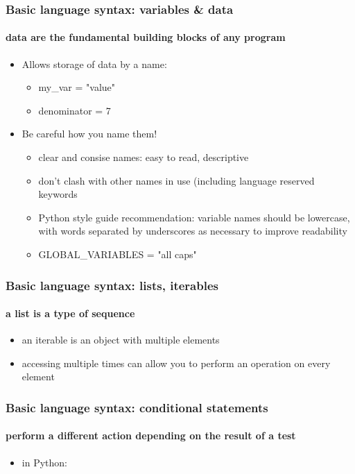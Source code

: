 \documentclass{beamer}
\begin{document}
    \begin{frame}
	    \frametitle{Basic language syntax: variables \& data}
	    \framesubtitle{data are the fundamental building blocks of any program}
	    \begin{itemize}
		    \item Allows storage of data by a name:
			    \begin{itemize}
				    \item my\_var = "value"
				    \item denominator = 7
			    \end{itemize}
		    \item Be careful how you name them!
			    \begin{itemize}
				    \item clear and consise names: easy to read, descriptive
				    \item don't clash with other names in use (including language reserved keywords
				    \item Python style guide recommendation: variable names should be lowercase, with words separated by underscores as necessary to improve readability
				    \item GLOBAL\_VARIABLES = "all caps"
			    \end{itemize}
	    \end{itemize}
    \end{frame}

    \begin{frame}
	    \frametitle{Basic language syntax: lists, iterables}
	    \framesubtitle{a list is a type of sequence}
	    \begin{itemize}
		    \item an iterable is an object with multiple elements
		    \item accessing multiple times can allow you to perform an operation on every element
	    \end{itemize}
    \end{frame}



    \begin{frame}
	    \frametitle{Basic language syntax: conditional statements}
	    \framesubtitle{perform a different action depending on the result of a test}
	    \begin{itemize}
		    \item in Python:
	    \end{itemize}
	    \lstI

    \end{frame}
\end{document}
